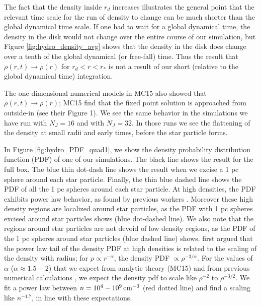 \documentclass[../dissertation.tex]{subfiles}
\begin{document}
The fact that the density inside $r_d$ increases illustrates the general point that the relevant time scale for the run of density to change can be much shorter than the global dynamical time scale. If one had to wait for a global dynamical time, the density in the disk would not change over the entire course of our simulation, but Figure \ref{fig:hydro_density_avg} shows that the density in the disk does change over a tenth of the global dynamical (or free-fall) time. Thus the result that $\rho(r,t)\to\rho(r)$ for $r_d< r < r_*$ is not a result of our short (relative to the global dynamical time) integration.

The one dimensional numerical models in MC15 also showed that
$\rho(r,t)\to \rho(r)$; MC15 find that the fixed point solution is
approached from outside-in (see their Figure 1). We see the
same behavior in the simulations we have run with $N_J = 16$ and
with $N_J=32$. In those runs we see the flattening of the density at
small radii and early times, before the star particle forms. 
 
 In Figure \ref{fig:hydro_PDF_quad1}, we show the density probability 
 distribution function (PDF) of one of our simulations. 
The black line shows the result for the full box.
The blue thin dot-dash line shows the result when we excise a 1 pc sphere around each star particle.
Finally, the thin blue dashed line shows the PDF of all the 1 pc spheres around each star particle.
At high densities, the PDF exhibits power 
 law behavior, as found by previous workers
 \citep{2000ApJ...535..869K,2011ApJ...727L..20K,2015ApJ...800...49L}.  
Moreover these high density regions are localized around star particles, 
 as the PDF with 1 pc spheres excised around star particles shows (blue dot-dashed line). 
We also note that the regions around star particles are not devoid of low density regions, 
as the PDF of the 1 pc spheres around star particles (blue dashed line) shows.
 \citet{2011ApJ...727L..20K} first argued that the power law tail of the 
 density PDF at high densities is related to the scaling of the density with radius; 
 for $\rho \propto r^{-\alpha}$, the density PDF $\propto \rho^{-3/\alpha}$.  
 For the values of $\alpha$ ($\alpha \approx 1.5-2$) that we expect from 
 analytic theory (MC15) and from previous numerical calculations
 \citep{2015ApJ...800...49L}, we expect the density pdf 
 to scale like $\rho^{-2}$ to $\rho^{-3/2}$. We fit a power law between 
 $n=10^4-10^9\,{\rm cm}^{-3}$ (red dotted line) and find a scaling like 
 $n^{-1.7}$, in line with these expectations.
\end{document}
